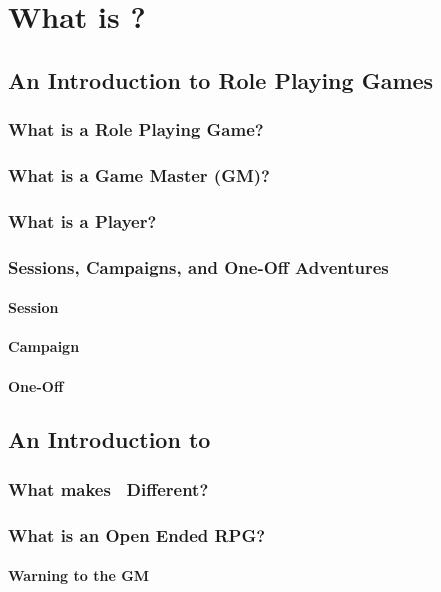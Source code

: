 \part{What is {\slshape\gametitle}?}\label{part:gametitle}

\chapter{An Introduction to Role Playing Games}\label{ch:intro_to_rpg}

\section{What is a Role Playing Game?}\label{sec:whatis_rpg}

\section{What is a Game Master (GM)?}\label{sec:whatis_gm}

\section{What is a Player?}\label{sec:whatis_player}

\section{Sessions, Campaigns, and One-Off Adventures}\label{sec:adventures}

\subsection{Session}\label{subsec:sessions}

\subsection{Campaign}\label{subsec:campaigns}

\subsection{One-Off}\label{subsec:one_off}

\chapter{An Introduction to {\slshape\gametitle}}\label{ch:game_intro}

\section{What makes \gametitle\ Different?}\label{sec:why_gametitle}

\section{What is an Open Ended RPG?}\label{whatis_openrpg}

\subsection{Warning to the GM}\label{subsec:holdit_gm}

